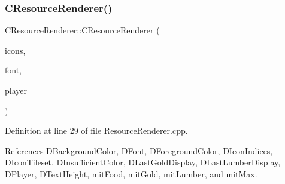 \subsubsection{\texorpdfstring{C\+Resource\+Renderer()}{CResourceRenderer()}}
{\footnotesize\ttfamily C\+Resource\+Renderer\+::\+C\+Resource\+Renderer (\begin{DoxyParamCaption}\item[{std\+::shared\+\_\+ptr$<$ \hyperlink{classCGraphicTileset}{C\+Graphic\+Tileset} $>$}]{icons,  }\item[{std\+::shared\+\_\+ptr$<$ \hyperlink{classCFontTileset}{C\+Font\+Tileset} $>$}]{font,  }\item[{std\+::shared\+\_\+ptr$<$ \hyperlink{classCPlayerData}{C\+Player\+Data} $>$}]{player }\end{DoxyParamCaption})}



Definition at line 29 of file Resource\+Renderer.\+cpp.



References D\+Background\+Color, D\+Font, D\+Foreground\+Color, D\+Icon\+Indices, D\+Icon\+Tileset, D\+Insufficient\+Color, D\+Last\+Gold\+Display, D\+Last\+Lumber\+Display, D\+Player, D\+Text\+Height, mit\+Food, mit\+Gold, mit\+Lumber, and mit\+Max.


